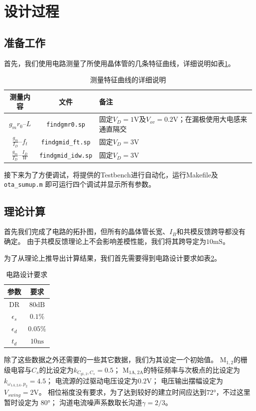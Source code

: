 \documentclass[a4paper]{article}
\newcommand{\uV}{\si{\volt}}
\newcommand{\uns}{\si{\nano\second}}
\newcommand{\umS}{\si{\milli\siemens}}
\newcommand{\udB}{\si{\deci\bel}}
\newcommand{\udeg}{\si{\degree}}
\newcommand{\dM}[1]{\mathrm{M}_\mathrm{#1}}
\newcommand{\DM}[1]{$\dM{#1}$}
\begin{document}
\section{设计过程}
\subsection{准备工作}
首先，我们使用电路测量了所使用晶体管的几条特征曲线，详细说明如表\ref{finds}。
\begin{table}[htb]
  \begin{center}
    \begin{tabular}{ccp{5cm}}
      测量内容 & 文件 & 备注 \\\hline
      $g_mr_0$--$L$ & \texttt{findgmr0.sp} & 
            固定$V_D=1\uV$及$V_{ov}=0.2\uV$；在漏极使用大电感来通直隔交 \\
      $\frac{g_m}{I_D}$--$f_t$ & \texttt{findgmid\_ft.sp} &
            固定$V_D=3\uV$    \\
      $\frac{g_m}{I_D}$--$\frac{I_D}{W}$ & \texttt{findgmid\_idw.sp} &
            固定$V_D=3\uV$    
    \end{tabular}
  \end{center}
  \caption{测量特征曲线的详细说明}
  \label{finds}
\end{table}

接下来为了方便调试，将提供的Testbench进行自动化，运行Makefile及\texttt{ota\_sumup.m}
即可运行四个调试并显示所有参数。

\subsection{理论计算}
首先我们完成了电路的拓扑图，但所有的晶体管长宽、$I_B$和共模反馈跨导都没有确定。
由于共模反馈理论上不会影响差模性能，我们将其跨导定为$10\umS$。

为了从理论上推导出计算结果，我们首先需要得到电路设计要求如表\ref{requirements}。
\begin{table}[htb]
  \begin{center}
    \begin{tabular}{cc}
      参数 & 要求 \\\hline
      DR & $80\udB$ \\
      $\epsilon_s$ & $0.1\%$ \\
      $\epsilon_d$ & $0.05\%$ \\
      $t_d$ & $10\uns$ \\
    \end{tabular}
  \end{center}
  \caption{电路设计要求}
  \label{requirements}
\end{table}
除了这些数据之外还需要的一些其它数据，我们为其设定一个初始值。
\DM{1,2}的栅级电容与$C_s$的比设定为$k_{C_{g1,2},C_s}=0.5$；
\DM{1A,2A}的特征频率与次极点的比设定为$k_{\omega_{1A,2A},p_2}=4.5$；
电流源的过驱动电压设定为$0.2\uV$；
电压输出摆幅设定为$V_{swing}=2\uV$。
相位裕度没有要求，为了达到较好的建立时间应达到$72\udeg$，不过这里暂时设定为
$80\udeg$；
沟道电流噪声系数取长沟道$\gamma=2/3$。
\end{document}
